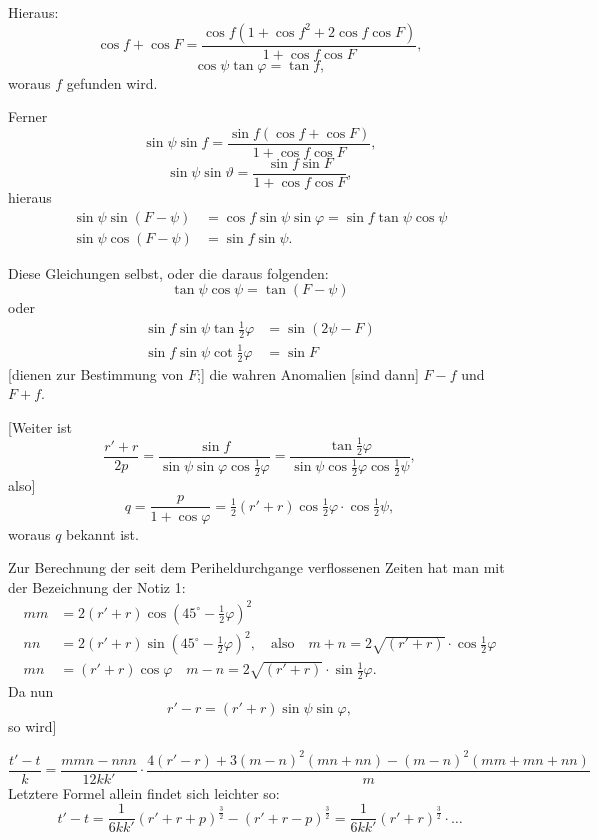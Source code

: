 \documentclass[12pt,a4paper]{article}
\begin{document}
Hieraus:
\[
\cos f + \cos F = \frac{\cos f(1 + \cos f^2 + 2\cos f\cos F)}{1 + \cos f\cos F},
\]
\[
\cos\psi\tan\varphi = \tan f,
\]
woraus $f$ gefunden wird.

Ferner
\[
\sin\psi\sin f = \frac{\sin f(\cos f + \cos F)}{1 + \cos f\cos F},
\]
\[
\sin\psi\sin\vartheta = \frac{\sin f\sin F}{1 + \cos f\cos F},
\]
hieraus
\begin{align*}
\sin\psi\sin(F - \psi) &= \cos f\sin\psi\sin\varphi = \sin f\tan\psi\cos\psi \\
\sin\psi\cos(F - \psi) &= \sin f\sin\psi.
\end{align*}

Diese Gleichungen selbst, oder die daraus folgenden:
\[
\tan\psi\cos\psi = \tan(F - \psi)
\]
oder
\begin{align*}
\sin f\sin\psi\tan\tfrac{1}{2}\varphi &= \sin(2\psi - F) \\
\sin f\sin\psi\cot\tfrac{1}{2}\varphi &= \sin F
\end{align*}
[dienen zur Bestimmung von $F$;] die wahren Anomalien [sind dann] $F - f$
und $F + f$.

[Weiter ist
\[
\frac{r' + r}{2p} = \frac{\sin f}{\sin\psi\sin\varphi\cos\tfrac{1}{2}\varphi} = \frac{\tan\tfrac{1}{2}\varphi}{\sin\psi\cos\tfrac{1}{2}\varphi\cos\tfrac{1}{2}\psi},
\]
also]
\[
q = \frac{p}{1 + \cos\varphi} = \tfrac{1}{2}(r' + r)\cos\tfrac{1}{2}\varphi \cdot \cos\tfrac{1}{2}\psi,
\]
woraus $q$ bekannt ist.

Zur Berechnung der seit dem Periheldurchgange verflossenen Zeiten hat
man mit der Bezeichnung der Notiz 1:
\begin{align*}
mm &= 2(r' + r)\cos(45^\circ - \tfrac{1}{2}\varphi)^2 \\
nn &= 2(r' + r)\sin(45^\circ - \tfrac{1}{2}\varphi)^2, \quad \text{also} \quad m + n = 2\sqrt{(r' + r)}\cdot\cos\tfrac{1}{2}\varphi \\
mn &= (r' + r)\cos\varphi \quad m - n = 2\sqrt{(r' + r)}\cdot\sin\tfrac{1}{2}\varphi.
\end{align*}
Da nun
\[
r' - r = (r' + r)\sin\psi\sin\varphi,
\]
so wird]

\newpage

\begin{equation}\tag{4}
\frac{t' - t}{k} = \frac{mmn - nnn}{12kk'} \cdot \frac{4(r' - r) + 3(m - n)^2(mn + nn) - (m - n)^2(mm + mn + nn)}{m}
\end{equation}
Letztere Formel allein findet sich leichter so:
\[
t' - t = \frac{1}{6kk'}(r' + r + p)^{\frac{3}{2}} - (r' + r - p)^{\frac{3}{2}} = \frac{1}{6kk'}(r' + r)^{\frac{3}{2}} \cdot \ldots
\]
\end{document}
